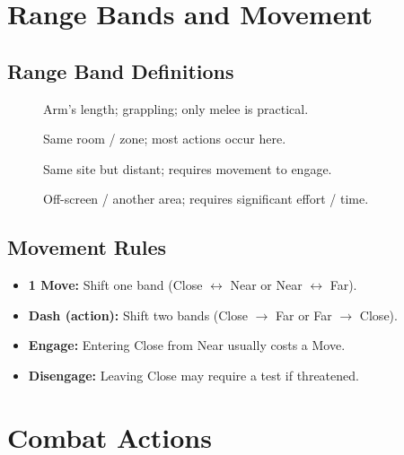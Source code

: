 \section{Range Bands and Movement}\label{sec:range_bands}

\subsection{Range Band Definitions}\label{subsec:range_definitions}
\begin{description}
    \item[] Arm's length; grappling; only melee is practical.
    \item[] Same room / zone; most actions occur here.
    \item[] Same site but distant; requires movement to engage.
    \item[] Off-screen / another area; requires significant effort / time.
\end{description}

\subsection{Movement Rules}\label{subsec:movement_rules}
\begin{itemize}
    \item \textbf{1 Move:} Shift one band (Close $\leftrightarrow$ Near or Near $\leftrightarrow$ Far).
    \item \textbf{Dash (action):} Shift two bands (Close $\rightarrow$ Far or Far $\rightarrow$ Close).
    \item \textbf{Engage:} Entering Close from Near usually costs a Move.
    \item \textbf{Disengage:} Leaving Close may require a test if threatened.
\end{itemize}

\section{Combat Actions}\label{sec:combat_actions}


